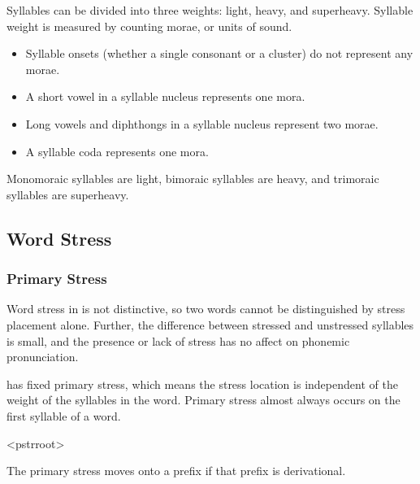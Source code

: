 Syllables can be divided into three weights: light, heavy, and superheavy. Syllable weight is measured by counting morae, or units of sound.

\begin{itemize}
	\item Syllable onsets (whether a single consonant or a cluster) do not represent any morae.
	\item A short vowel in a syllable nucleus represents one mora.
	\item Long vowels and diphthongs in a syllable nucleus represent two morae.
	\item A syllable coda represents one mora.
\end{itemize}

Monomoraic syllables are light, bimoraic syllables are heavy, and trimoraic syllables are superheavy.


\subsection{Word Stress}
\label{sec:word-stress}

\subsubsection{Primary Stress}
\label{sec:primary-stress}

Word stress in \lang{} is not distinctive, so two words cannot be distinguished by stress placement alone. Further, the difference between stressed and unstressed syllables is small, and the presence or lack of stress has no affect on phonemic pronunciation.

\lang{} has fixed primary stress, which means the stress location is independent of the weight of the syllables in the word.\autocite{wals-14} Primary stress almost always occurs on the first syllable of a word.

\ex<pstrroot>
	   
\xe

The primary stress moves onto a prefix if that prefix is derivational.

